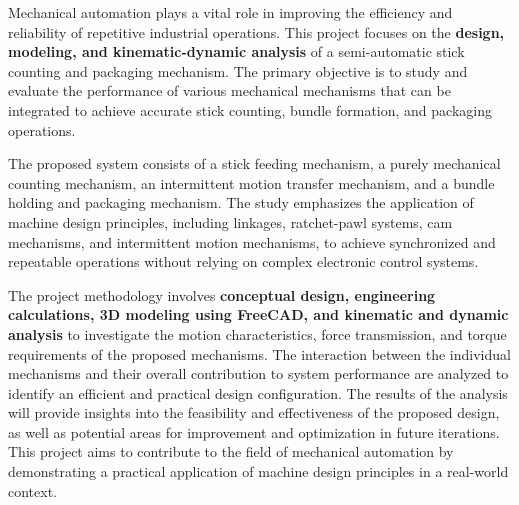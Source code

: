 Mechanical automation plays a vital role in improving the efficiency and reliability of repetitive industrial operations. This project focuses on the \textbf{design, modeling, and kinematic-dynamic analysis} of a semi-automatic stick counting and packaging mechanism. The primary objective is to study and evaluate the performance of various mechanical mechanisms that can be integrated to achieve accurate stick counting, bundle formation, and packaging operations.

\vspace{12px}
The proposed system consists of a stick feeding mechanism, a purely mechanical counting mechanism, an intermittent motion transfer mechanism, and a bundle holding and packaging mechanism. The study emphasizes the application of machine design principles, including linkages, ratchet-pawl systems, cam mechanisms, and intermittent motion mechanisms, to achieve synchronized and repeatable operations without relying on complex electronic control systems.

\vspace{12px}
The project methodology involves \textbf{conceptual design, engineering calculations, 3D modeling using FreeCAD, and kinematic and dynamic analysis} to investigate the motion characteristics, force transmission, and torque requirements of the proposed mechanisms. The interaction between the individual mechanisms and their overall contribution to system performance are analyzed to identify an efficient and practical design configuration. The results of the analysis will provide insights into the feasibility and effectiveness of the proposed design, as well as potential areas for improvement and optimization in future iterations. This project aims to contribute to the field of mechanical automation by demonstrating a practical application of machine design principles in a real-world context.